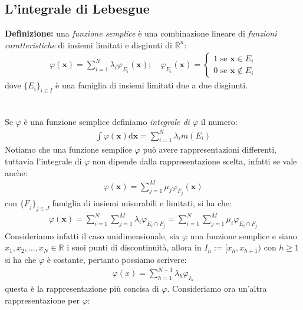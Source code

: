 \documentclass{article}
\numberwithin{equation}{subsection}
\begin{document}
\subsection{L'integrale di Lebesgue}
\textbf{Definizione:} una \textit{funzione semplice} è una combinazione lineare di \textit{funzioni caratteristiche} di insiemi limitati e disgiunti di $\mathbb{R}^n$:
\begin{gather*}
    \varphi(\mathbf{x}) = \sum_{i = 1}^N \lambda_i \varphi_{E_i}(\mathbf{x}); \quad
    \varphi_{E_i}(\mathbf{x}) = \begin{cases}
        1 \text{ se } \mathbf{x} \in E_i \\
        0 \text{ se } \mathbf{x} \not\in E_i 
    \end{cases}
\end{gather*}
dove $\{ E_i \}_{i \in I}$ è una famiglia di insiemi limitati due a due disgiunti. \\ \\ \\
Se $\varphi$ è una funzione semplice definiamo \textit{integrale di $\varphi$} il numero:
\begin{align*}
    \int \varphi(\mathbf{x}) \mathrm{d}\mathbf{x} = \sum_{i = 1}^N \lambda_i m(E_i) 
\end{align*}
Notiamo che una funzione semplice $\varphi$ può avere rappresentazioni differenti, tuttavia l'integrale di $\varphi$ non dipende dalla rappresentazione scelta, infatti se vale anche:
\begin{align*}
    \varphi(\mathbf{x}) = \sum_{j = 1}^M \mu_j \varphi_{F_j}(\mathbf{x}) 
\end{align*}
con $\{ F_j \}_{j \in J}$ famiglia di insiemi misurabili e limitati, si ha che:
\begin{align*}
    \varphi(\mathbf{x}) = \sum_{i = 1}^N \sum_{j = 1}^M \lambda_i \varphi_{E_i \cap F_j} = \sum_{i = 1}^N \sum_{j = 1}^M \mu_i \varphi_{E_i \cap F_j} 
\end{align*}
Consideriamo infatti il caso unidimensionale, sia $\varphi$ una funzione semplice e siano \\ $x_1, x_2, \dots, x_N \in \mathbb{R}$ i suoi punti di discontinuità, allora in $I_h := [x_h, x_{h + 1})$ con $h \geq 1$ si ha che $\varphi$ è costante, pertanto possiamo scrivere:
\begin{align*}
    \varphi(x) = \sum_{h = 1}^{N - 1} \lambda_h \varphi_{I_h} 
\end{align*}
questa è la rappresentazione più concisa di $\varphi$. Consideriamo ora un'altra rappresentazione per $\varphi$:
\end{document}
